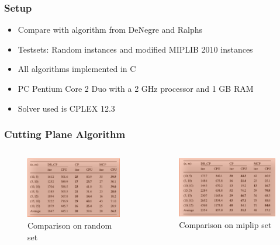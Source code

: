 \documentclass[11pt]{beamer}
\begin{document}
\begin{frame}
	\frametitle{Setup}
	\begin{itemize}
		\item Compare with algorithm from DeNegre and Ralphs
		\item Testsets: Random instances and modified MIPLIB 2010 instances
		\item All algorithms implemented in C
		\item PC Pentium Core 2 Duo with a 2 GHz processor and 1 GB RAM
		\item Solver used is CPLEX 12.3
	\end{itemize}
\end{frame}
\begin{frame}
	\frametitle{Cutting Plane Algorithm}
	\begin{columns}[T]
		\begin{column}{.48\textwidth}
	\begin{figure}
		\includegraphics[width=\textwidth]{table_cp.png}
		\caption{Comparison on random set}
	\end{figure}
	\end{column}
	\begin{column}{.48\textwidth}
	\begin{figure}
		\includegraphics[width=\textwidth]{table_cp_miplip.png}
		\caption{Comparison on miplip set}
	\end{figure}
	\end{column}
	\end{columns}
\end{frame}
\end{document}
